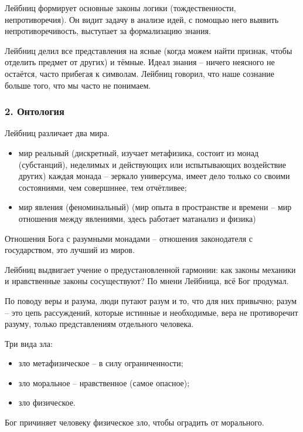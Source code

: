 \documentclass[a4paper, 12pt]{book} %
\begin{document}
Лейбниц формирует основные законы логики (тождественности, непротиворечия). Он видит задачу в анализе идей, с помощью него выявить непротиворечивость, выступает за формализацию знания.

Лейбниц делил все представления на ясные (когда можем найти признак, чтобы отделить предмет от других) и тёмные. Идеал знания -- ничего неясного не остаётся, часто прибегая к символам. Лейбниц говорил, что наше сознание больше того, что мы часто не понимаем.

\subsubsection*{2. Онтология}
Лейбниц различает два мира.
\begin{itemize}
\item мир реальный (дискретный, изучает метафизика, состоит из монад (субстанций), неделимых и действующих или испытывающих воздействие других) каждая монада -- зеркало универсума, имеет дело только со своими состояниями, чем совершннее, тем отчётливее; 
\item мир явления (феноминальный) (мир опыта в пространстве и времени -- мир отношения между явлениями, здесь работает матанализ и физика)
\end{itemize}	

Отношения Бога с разумными монадами -- отношения законодателя с государством, это лучший из миров.

Лейбниц выдвигает учение о предустановленной гармонии: как законы механики и нравственные законы сосуществуют? По мнени Лейбница, всё Бог продумал.

По поводу веры и разума, люди путают разум и то, что для них привычно; разум -- это цепь рассуждений, которые истинные и необходимые, вера не противоречит разуму, только представлениям отдельного человека.

Три вида зла:
\begin{itemize}
\item зло метафизическое -- в силу ограниченности;
\item зло моральное -- нравственное (самое опасное);
\item зло физическое.
\end{itemize}
Бог причиняет человеку физическое зло, чтобы оградить от морального.

\tableofcontents 
\end{document}
